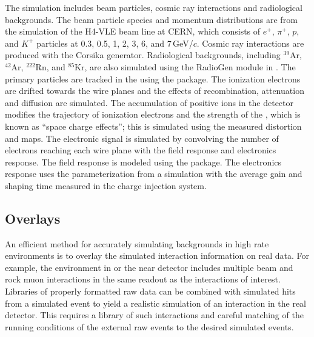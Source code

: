 \documentclass[../main-v1.tex]{subfiles}
\begin{document}
The  simulation includes beam particles, cosmic ray interactions and radiological backgrounds. The beam particle species and momentum distributions are from the  simulation of the H4-VLE beam line at CERN, which consists of $e^{+}$, $\pi^{+}$, $p$, and $K^{+}$ particles at 0.3, 0.5, 1, 2, 3, 6, and 7\,GeV/$c$. Cosmic ray interactions are produced with the Corsika generator. Radiological backgrounds, including $^{39}$Ar, $^{42}$Ar, $^{222}$Rn, and $^{85}$Kr, are also simulated using the RadioGen module in . The primary particles are tracked in the  using the  package. 
The ionization electrons are drifted towards the wire planes %
and the effects of recombination, attenuation and diffusion are simulated. The accumulation of positive ions in the detector modifies the trajectory of ionization electrons and the strength of the \efield, which is 
known as ``space charge effects''; this is simulated using the measured distortion and \efield maps. The electronic signal is simulated by convolving the number of electrons reaching each wire plane with the field response and electronics response. The field response is modeled using the \cite{Veenhof:1998tt} package. 
The electronics response uses the parameterization from a  simulation with the average gain and shaping time measured in the  charge injection system. 




\subsection{Overlays}
\label{sec:usecases_overlays}
An efficient method for accurately simulating backgrounds in high rate environments is to overlay the simulated interaction information on real data.  For example, the environment in  or the near detector includes multiple beam and rock muon interactions in the same readout as %
the interactions of interest.  Libraries of properly formatted raw data can be combined with simulated hits from a simulated event to yield a realistic simulation of an interaction in the real detector. This requires a library of such interactions and careful matching of the running conditions of the external raw events to the desired simulated events. 
\end{document}
